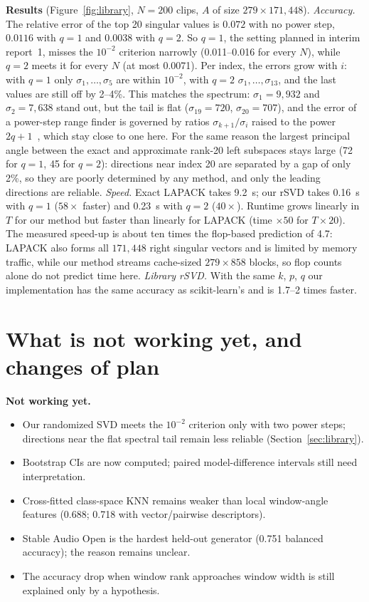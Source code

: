 \documentclass[11pt,a4paper]{article}
\theoremstyle{plain}
\theoremstyle{definition}
\theoremstyle{remark}
\begin{document}
\textbf{Results} (Figure~\ref{fig:library}, $N=200$ clips, $A$ of size
$279\times171{,}448$). \emph{Accuracy.} The relative error of the top 20
singular values is $0.072$ with no power step, $0.0116$ with $q=1$ and
$0.0038$ with $q=2$. So $q=1$, the setting planned in interim report~1, misses
the $10^{-2}$ criterion narrowly (0.011--0.016 for every $N$), while $q=2$ meets
it for every $N$ (at most 0.0071). Per index, the errors grow with $i$: with
$q=1$ only $\sigma_1,\dots,\sigma_5$ are within $10^{-2}$, with $q=2$
$\sigma_1,\dots,\sigma_{13}$, and the last values are still off by 2--4\%. This
matches the spectrum: $\sigma_1=9{,}932$ and $\sigma_2=7{,}638$ stand out, but
the tail is flat ($\sigma_{19}=720$, $\sigma_{20}=707$), and the error of a
power-step range finder is governed by ratios $\sigma_{k+1}/\sigma_i$ raised
to the power $2q+1$~\cite{Halko}, which stay close to one here. For the same
reason the largest principal angle between the exact and approximate rank-20
left subspaces stays large (72\textdegree{} for $q=1$, 45\textdegree{} for
$q=2$): directions near index 20 are separated by a gap of only 2\%, so they
are poorly determined by any method, and only the leading directions are
reliable. \emph{Speed.} Exact LAPACK takes 9.2~s; our rSVD takes 0.16~s with
$q=1$ ($58\times$ faster) and 0.23~s with $q=2$ ($40\times$). Runtime grows
linearly in $T$ for our method but faster than linearly for LAPACK (time
$\times50$ for $T\times20$). The measured speed-up is about ten times the
flop-based prediction of 4.7: LAPACK also forms all $171{,}448$ right
singular vectors and is limited by memory traffic, while our method streams
cache-sized $279\times858$ blocks, so flop counts alone do not predict time
here. \emph{Library rSVD.} With the same $k$, $p$, $q$ our implementation has
the same accuracy as scikit-learn's and is 1.7--2 times faster.

\section{What is not working yet, and changes of plan}
\textbf{Not working yet.}
\begin{itemize}\itemsep0pt
\item Our randomized SVD meets the $10^{-2}$ criterion only with two power
  steps; directions near the flat spectral tail remain less reliable
  (Section~\ref{sec:library}).
\item Bootstrap CIs are now computed; paired model-difference intervals still
  need interpretation.
\item Cross-fitted class-space KNN remains weaker than local window-angle
  features (0.688; 0.718 with vector/pairwise descriptors).
\item Stable Audio Open is the hardest held-out generator (0.751 balanced
  accuracy); the reason remains unclear.
\item The accuracy drop when window rank approaches window width is still
  explained only by a hypothesis.
\end{itemize}
\end{document}
